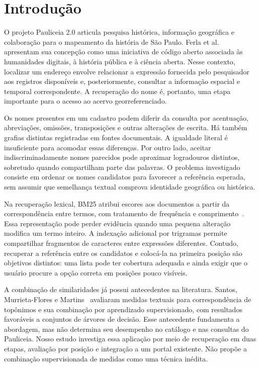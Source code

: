 \section{Introdução}

O projeto Pauliceia 2.0 articula pesquisa histórica, informação geográfica e colaboração para o mapeamento da história de São Paulo. Ferla et al.~\cite{ferla2020} apresentam sua concepção como uma iniciativa de código aberto associada às humanidades digitais, à história pública e à ciência aberta. Nesse contexto, localizar um endereço envolve relacionar a expressão fornecida pelo pesquisador aos registros disponíveis e, posteriormente, consultar a informação espacial e temporal correspondente. A recuperação do nome é, portanto, uma etapa importante para o acesso ao acervo georreferenciado.

Os nomes presentes em um cadastro podem diferir da consulta por acentuação, abreviações, omissões, transposições e outras alterações de escrita. Há também grafias distintas registradas em fontes documentais. A igualdade literal é insuficiente para acomodar essas diferenças. Por outro lado, aceitar indiscriminadamente nomes parecidos pode aproximar logradouros distintos, sobretudo quando compartilham parte das palavras. O problema investigado consiste em ordenar os nomes candidatos para favorecer a referência esperada, sem assumir que semelhança textual comprova identidade geográfica ou histórica.

Na recuperação lexical, BM25 atribui escores aos documentos a partir da correspondência entre termos, com tratamento de frequência e comprimento~\cite{elasticSimilarity}. Essa representação pode perder evidência quando uma pequena alteração modifica um termo inteiro. A indexação adicional por trigramas permite compartilhar fragmentos de caracteres entre expressões diferentes. Contudo, recuperar a referência entre os candidatos e colocá-la na primeira posição são objetivos distintos: uma lista pode ter cobertura adequada e ainda exigir que o usuário procure a opção correta em posições pouco visíveis.

A combinação de similaridades já possui antecedentes na literatura. Santos, Murrieta-Flores e Martins~\cite{santos2018} avaliaram medidas textuais para correspondência de topônimos e sua combinação por aprendizado supervisionado, com resultados favoráveis a conjuntos de árvores de decisão. Esse antecedente fundamenta a abordagem, mas não determina seu desempenho no catálogo e nas consultas do Pauliceia. Nosso estudo investiga essa aplicação por meio de recuperação em duas etapas, avaliação por posição e integração a um portal existente. Não propõe a combinação supervisionada de medidas como uma técnica inédita.

